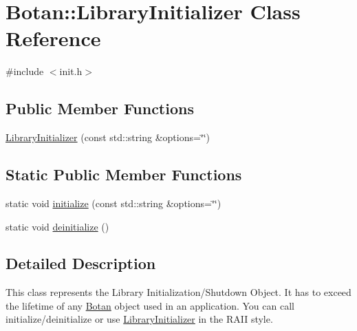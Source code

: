 \hypertarget{classBotan_1_1LibraryInitializer}{\section{Botan\-:\-:Library\-Initializer Class Reference}
\label{classBotan_1_1LibraryInitializer}
}


{\ttfamily \#include $<$init.\-h$>$}

\subsection*{Public Member Functions}
\begin{DoxyCompactItemize}
\item 
\hyperlink{classBotan_1_1LibraryInitializer_a4c4cadd81737bfce7fd8e046672518ae}{Library\-Initializer} (const std\-::string \&options=\char`\"{}\char`\"{})
\end{DoxyCompactItemize}
\subsection*{Static Public Member Functions}
\begin{DoxyCompactItemize}
\item 
static void \hyperlink{classBotan_1_1LibraryInitializer_a7b06d191b1edb62607ee69266ebe87c3}{initialize} (const std\-::string \&options=\char`\"{}\char`\"{})
\item 
static void \hyperlink{classBotan_1_1LibraryInitializer_a8132354902cc1c99d9aa9643b87b8522}{deinitialize} ()
\end{DoxyCompactItemize}


\subsection{Detailed Description}
This class represents the Library Initialization/\-Shutdown Object. It has to exceed the lifetime of any \hyperlink{namespaceBotan}{Botan} object used in an application. You can call initialize/deinitialize or use \hyperlink{classBotan_1_1LibraryInitializer}{Library\-Initializer} in the R\-A\-I\-I style. 

